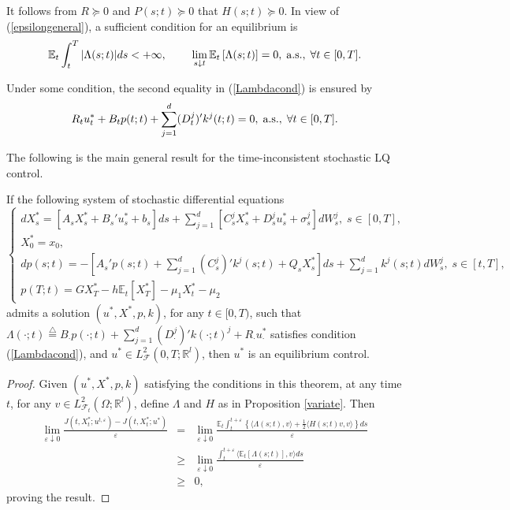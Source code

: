\documentclass[final]{siamltex}
\begin{document}
\medskip

It follows from  $R\succeq0$ and $P(s;t)\succeq 0$ that  $H(s;t)\succeq 0$.
In view of (\ref{epsilongeneral}),
a sufficient condition for an equilibrium is
\begin{equation}\label{Lambdacond}
\mathbb E_t\int_t^T|\Lambda(s;t)|ds<+\infty,\;\qquad \lim_{s\downarrow t} {\mathbb{E}_t\left[{\Lambda(s;t)}\right]}=0,\;{\mbox{{\rm a.s.}}}, \;\forall t\in[0,T].
\end{equation}

Under some condition, the second equality in (\ref{Lambdacond}) is ensured by
\begin{equation}\label{maximalprinciple}
R_t u^*_t+B_tp(t;t)+\sum_{j=1}^d(D_t^j)'k^j(t;t)=0,\;{\mbox{{\rm a.s.}}}, \;\forall t\in[0,T].
\end{equation}

The following is the main general result for the time-inconsistent stochastic LQ control.

\begin{theorem}\label{maingeneral}
If the following system of  stochastic differential equations
\begin{equation}\label{fbsdegeneral}
\left\{
\begin{array}{l}
dX^*_s=[A_sX^*_s+B_s'u^*_s+b_s]ds+ \sum_{j=1}^d[C_s^jX^*_s+D_s^{j} u^*_s+\sigma_s^{j} ]dW_s^{j},\; s\in[0,T],\\
X^*_0=x_0,\\
dp(s;t)=-[A_s'p(s;t)+\sum_{j=1}^d(C_s^j)' k^j(s;t)+Q_sX^*_s]ds+\sum_{j=1}^dk^j(s;t)dW_s^j,\; s\in[t,T],\\
p(T;t)=G X^*_T- h {\mathbb{E}_t\left[{X^*_T}\right]}-\mu_1 X_t^*-\mu_2
\end{array}\right.
\end{equation}
admits a solution $(u^*, X^*,p,k)$,  for any $t\in [0, T)$, such that  $\Lambda(\cdot; t){\stackrel{\triangle}{=}} B_\cdot p(\cdot;t)+\sum_{j=1}^d(D_\cdot^j)'k(\cdot;t)^j+R_\cdot u^*_\cdot$
satisfies condition (\ref{Lambdacond}), and $u^*\in L^2_{{\mathcal F}}(0,T; {\mathbb{R}}^l)$, then $u^*$ is an equilibrium control.
\end{theorem}

\begin{proof}
Given $(u^*, X^*, p, k)$ satisfying the conditions in this theorem,
at any time $t$, for any  $v\in L^2_{{{\mathcal F}}_t}(\Omega; {\mathbb{R}}^l)$, define $\Lambda$ and $H$ as in Proposition \ref{variate}.  Then
\begin{eqnarray*}
\lim_{\varepsilon\downarrow 0} \frac{J(t,X^*_t; u^{t,\varepsilon})-J(t,X^*_t;u^*)}{\varepsilon}
&=&\lim_{\varepsilon\downarrow 0}\frac{\mathbb E_t\int_t^{t+\varepsilon}\left\{{\langle  {\Lambda(s;t), v} \rangle }
+\frac{1}{2}{\langle  {H(s;t)v, v} \rangle }\right\}ds}{\varepsilon}\\
&\geq &\lim_{\varepsilon\downarrow 0}\frac{\int_t^{t+\varepsilon}{\langle  {{\mathbb{E}_t\left[{\Lambda(s;t)}\right]}, v} \rangle }ds}{\varepsilon}\\
 
&\ge &0,
\end{eqnarray*}
proving the result.
\end{proof}
\end{document}
